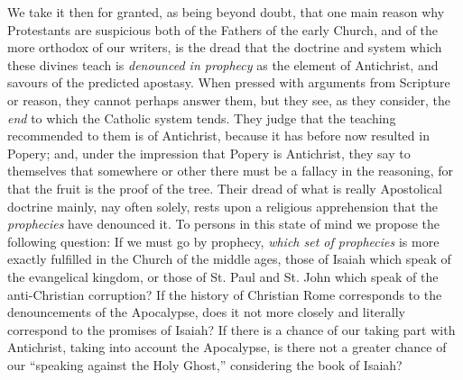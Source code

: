 We take it then for granted, as being beyond doubt, that one main
reason why Protestants are suspicious both of the Fathers of the early
Church, and of the more orthodox of our writers, is the dread that the
doctrine and system which these divines teach is \emph{denounced in
prophecy} as the element of Antichrist, and savours of the
predicted apostasy. When pressed with arguments from Scripture or
reason, they cannot perhaps answer them, but they see, as they
consider, the \emph{end} to which the Catholic system tends. They judge that
the teaching recommended to them is of Antichrist, because it has
before now resulted in Popery; and, under the impression that Popery
is Antichrist, they say to themselves that somewhere or other there
must be a fallacy in the reasoning, for that the fruit is the proof of
the tree. Their dread of what is really Apostolical doctrine mainly,
nay often solely, rests upon a religious apprehension that the \emph{prophecies}
have denounced it. To persons in this state of mind we propose the
following question: If we must go by prophecy, \emph{which set of
prophecies} is more exactly fulfilled in the Church of the middle
ages, those of Isaiah which speak of the evangelical kingdom, or those
of St. Paul and St. John which speak of the anti-Christian corruption?
If the history of Christian Rome corresponds to the denouncements of
the Apocalypse, does it not more closely and literally correspond to
the promises of Isaiah? If there is a chance of our taking part with
Antichrist, taking into account the Apocalypse, is there not a greater
chance of our ``speaking against the Holy Ghost,'' considering
the book of Isaiah?


